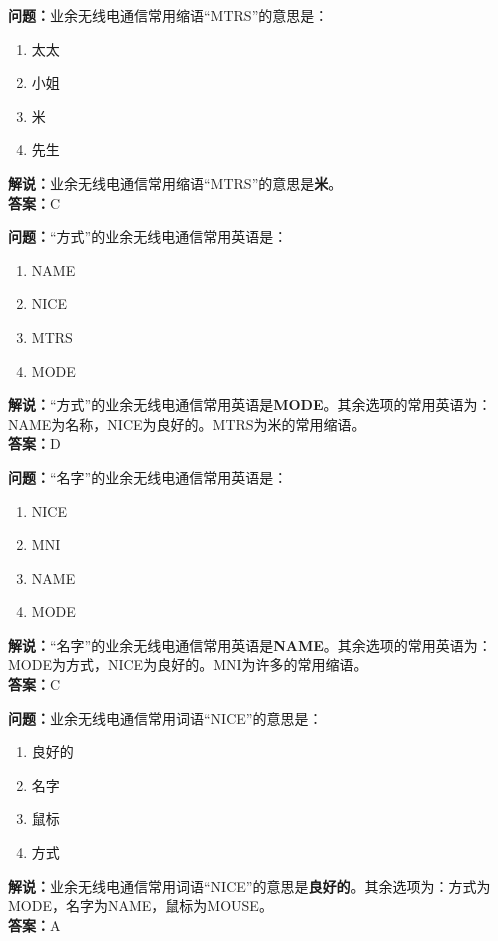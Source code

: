 \bigskip


\noindent\textbf{问题：}业余无线电通信常用缩语“MTRS”的意思是：
\begin{enumerate}[label=\Alph*), leftmargin=3em]
\item 太太
\item 小姐
\item 米
\item 先生
\end{enumerate}
\noindent\textbf{解说：}业余无线电通信常用缩语“MTRS”的意思是\textbf{米}。\\\noindent\textbf{答案：}C



\bigskip


\noindent\textbf{问题：}“方式”的业余无线电通信常用英语是：
\begin{enumerate}[label=\Alph*), leftmargin=3em]
\item NAME
\item NICE
\item MTRS
\item MODE
\end{enumerate}
\noindent\textbf{解说：}“方式”的业余无线电通信常用英语是\textbf{MODE}。其余选项的常用英语为：NAME为名称，NICE为良好的。MTRS为米的常用缩语。\\\noindent\textbf{答案：}D



\bigskip


\noindent\textbf{问题：}“名字”的业余无线电通信常用英语是：
\begin{enumerate}[label=\Alph*), leftmargin=3em]
\item NICE
\item MNI
\item NAME
\item MODE
\end{enumerate}
\noindent\textbf{解说：}“名字”的业余无线电通信常用英语是\textbf{NAME}。其余选项的常用英语为：MODE为方式，NICE为良好的。MNI为许多的常用缩语。\\\noindent\textbf{答案：}C



\bigskip


\noindent\textbf{问题：}业余无线电通信常用词语“NICE”的意思是：
\begin{enumerate}[label=\Alph*), leftmargin=3em]
\item 良好的
\item 名字
\item 鼠标
\item 方式
\end{enumerate}
\noindent\textbf{解说：}业余无线电通信常用词语“NICE”的意思是\textbf{良好的}。其余选项为：方式为MODE，名字为NAME，鼠标为MOUSE。\\\noindent\textbf{答案：}A



